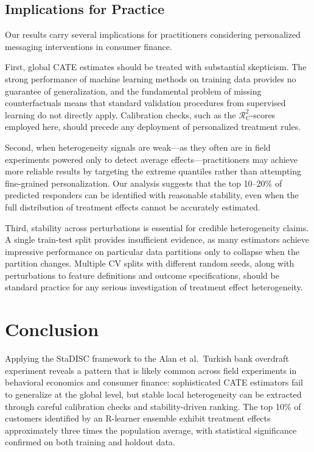 \documentclass[11pt,a4paper]{article}
\newcommand{\rsquare}{\ensuremath{\mathcal{R}^2_{\mathrm{C}}}}
\begin{document}
\subsection{Implications for Practice}
Our results carry several implications for practitioners considering personalized messaging interventions in consumer finance.

First, global CATE estimates should be treated with substantial skepticism. The strong performance of machine learning methods on training data provides no guarantee of generalization, and the fundamental problem of missing counterfactuals means that standard validation procedures from supervised learning do not directly apply. Calibration checks, such as the $\rsquare$-scores employed here, should precede any deployment of personalized treatment rules.

Second, when heterogeneity signals are weak---as they often are in field experiments powered only to detect average effects---practitioners may achieve more reliable results by targeting the extreme quantiles rather than attempting fine-grained personalization. Our analysis suggests that the top 10--20\% of predicted responders can be identified with reasonable stability, even when the full distribution of treatment effects cannot be accurately estimated.

Third, stability across perturbations is essential for credible heterogeneity claims. A single train-test split provides insufficient evidence, as many estimators achieve impressive performance on particular data partitions only to collapse when the partition changes. Multiple CV splits with different random seeds, along with perturbations to feature definitions and outcome specifications, should be standard practice for any serious investigation of treatment effect heterogeneity.

\section{Conclusion}

Applying the StaDISC framework to the Alan et al.\ Turkish bank overdraft experiment reveals a pattern that is likely common across field experiments in behavioral economics and consumer finance: sophisticated CATE estimators fail to generalize at the global level, but stable local heterogeneity can be extracted through careful calibration checks and stability-driven ranking. The top 10\% of customers identified by an R-learner ensemble exhibit treatment effects approximately three times the population average, with statistical significance confirmed on both training and holdout data.
\end{document}
